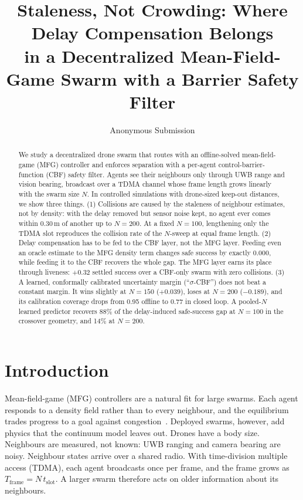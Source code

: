 \documentclass{article}
\title{Staleness, Not Crowding: Where Delay Compensation Belongs\\in a Decentralized Mean-Field-Game Swarm with a Barrier Safety Filter}
\author{
    Anonymous Submission
    \affiliations
    \emails
}
\newcommand{\Tf}{T_{\mathrm{frame}}}
\newcommand{\tslot}{t_{\mathrm{slot}}}
\begin{document}
\maketitle

\begin{abstract}
We study a decentralized drone swarm that routes with an offline-solved mean-field-game (MFG)
controller and enforces separation with a per-agent control-barrier-function (CBF) safety filter.
Agents see their neighbours only through UWB range and vision bearing, broadcast over a TDMA
channel whose frame length grows linearly with the swarm size $N$. In controlled simulations
with drone-sized keep-out distances, we show three things.
(1) Collisions are caused by the staleness of neighbour estimates, not by density: with
the delay removed but sensor noise kept, no agent ever comes within 0.30\,m of another up to
$N{=}200$. At a fixed $N{=}100$, lengthening only the TDMA slot reproduces the collision rate of
the $N$-sweep at equal frame length.
(2) Delay compensation has to be fed to the CBF layer, not the MFG layer. Feeding even an oracle
estimate to the MFG density term changes safe success by exactly $0.000$, while feeding it to the
CBF recovers the whole gap. The MFG layer earns its place through liveness: $+0.32$ settled
success over a CBF-only swarm with zero collisions.
(3) A learned, conformally calibrated uncertainty margin (``$\sigma$-CBF'') does not beat a
constant margin. It wins slightly at $N{=}150$ ($+0.039$), loses at $N{=}200$ ($-0.189$), and
its calibration coverage drops from 0.95 offline to 0.77 in closed loop.
A pooled-$N$ learned predictor recovers 88\% of the delay-induced safe-success gap at $N{=}100$
in the crossover geometry, and 14\% at $N{=}200$.
\end{abstract}

\section{Introduction}

Mean-field-game (MFG) controllers are a natural fit for large swarms. Each agent responds to a
density field rather than to every neighbour, and the equilibrium trades progress to a goal
against congestion~\cite{lasry2007mean,huang2006large,elamvazhuthi2019mean}. Deployed swarms,
however, add physics that the continuum model leaves out. Drones have a body size. Neighbours are
measured, not known: UWB ranging and camera bearing are noisy. Neighbour states arrive over a shared
radio. With time-division multiple access (TDMA), each agent broadcasts once per frame, and the
frame grows as $\Tf = N\,\tslot$. A larger swarm therefore acts on older information about its
neighbours.
\end{document}
